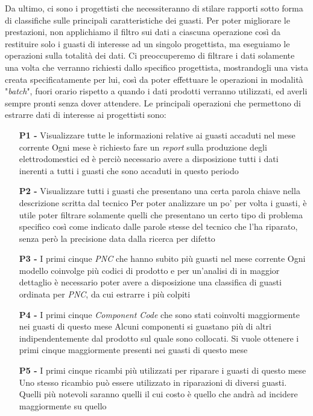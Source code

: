 \documentclass[a4paper, 12pt]{report}
\begin{document}
Da ultimo, ci sono i progettisti che necessiteranno di stilare rapporti sotto forma di classifiche sulle principali caratteristiche dei guasti. Per poter migliorare le prestazioni,
non applichiamo il filtro sui dati a ciascuna operazione così da restituire solo i guasti di interesse ad un singolo progettista, ma eseguiamo le operazioni sulla totalità
dei dati. Ci preoccuperemo di filtrare i dati solamente una volta che verranno richiesti dallo specifico progettista, mostrandogli una vista creata specificatamente per lui, così
da poter effettuare le operazioni in modalità "\textit{batch}", fuori orario rispetto a quando i dati prodotti verranno utilizzati, ed averli sempre pronti senza dover attendere.
Le principali operazioni che permettono di estrarre dati di interesse ai progettisti sono:

\begin{itemize}
	\item[\textbf{P1 -}] Visualizzare tutte le informazioni relative ai guasti accaduti nel mese corrente
		\subitem Ogni mese è richiesto fare un \textit{report} sulla produzione degli elettrodomestici ed è perciò necessario avere a disposizione tutti i dati inerenti a
		tutti i guasti che sono accaduti in questo periodo
	\item[\textbf{P2 -}] Visualizzare tutti i guasti che presentano una certa parola chiave nella descrizione scritta dal tecnico
		\subitem Per poter analizzare un po' per volta i guasti, è utile poter filtrare solamente quelli che presentano un certo tipo di problema specifico così come indicato
		dalle parole stesse del tecnico che l'ha riparato, senza però la precisione data dalla ricerca per difetto
	\item[\textbf{P3 -}] I primi cinque \textit{PNC} che hanno subito più guasti nel mese corrente
		\subitem Ogni modello coinvolge più codici di prodotto e per un'analisi di in maggior dettaglio è necessario poter avere a disposizione una classifica
		di guasti ordinata per \textit{PNC}, da cui estrarre i più colpiti
	\item[\textbf{P4 -}] I primi cinque \textit{Component Code} che sono stati coinvolti maggiormente nei guasti di questo mese
		\subitem Alcuni componenti si guastano più di altri indipendentemente dal prodotto sul quale sono collocati. Si vuole ottenere i primi cinque maggiormente presenti nei guasti di questo 
		mese
	\item[\textbf{P5 -}] I primi cinque ricambi più utilizzati per riparare i guasti di questo mese
		\subitem Uno stesso ricambio può essere utilizzato in riparazioni di diversi guasti. Quelli più notevoli saranno quelli il cui costo è quello che andrà ad incidere maggiormente su quello 

\end{itemize}
\end{document}
